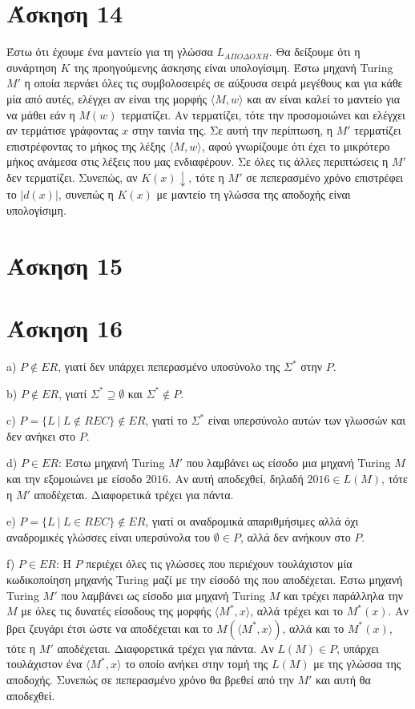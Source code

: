 \documentclass[a4paper, oneside, 11pt]{article}
\theoremstyle{definition}
\begin{document}
\section*{Άσκηση 14}
Έστω ότι έχουμε ένα μαντείο για τη γλώσσα $L_{A\Pi O\Delta OXH}$. Θα δείξουμε ότι η συνάρτηση $K$ της προηγούμενης άσκησης είναι υπολογίσιμη. Έστω μηχανή Turing $M'$ η οποία
περνάει όλες τις συμβολοσειρές σε αύξουσα σειρά μεγέθους και για κάθε μία από αυτές, ελέγχει αν είναι της μορφής $\langle M,w\rangle$ και αν είναι καλεί το μαντείο για να μάθει
εάν η $M(w)$ τερματίζει. Αν τερματίζει, τότε την προσομοιώνει και ελέγχει αν τερμάτισε γράφοντας $x$ στην ταινία της. Σε αυτή την περίπτωση, η $M'$ τερματίζει επιστρέφοντας
το μήκος της λέξης $\langle M, w\rangle$, αφού γνωρίζουμε ότι έχει το μικρότερο μήκος ανάμεσα στις λέξεις που μας ενδιαφέρουν. Σε όλες τις άλλες περιπτώσεις η $M'$ δεν τερματίζει.
Συνεπώς, αν $K(x)\downarrow$, τότε η $M'$ σε πεπερασμένο χρόνο επιστρέφει το $|d(x)|$, συνεπώς η $K(x)$ με μαντείο τη γλώσσα της αποδοχής είναι υπολογίσιμη.

\section*{Άσκηση 15}
\section*{Άσκηση 16}
a) $P\notin ER$, γιατί δεν υπάρχει πεπερασμένο υποσύνολο της $\Sigma^*$ στην $P$.

b) $P\notin ER$, γιατί $\Sigma^*\supseteq \emptyset$ και $\Sigma^*\notin P$.

c) $P=\{L\ |\ L\notin REC\}\notin ER$, γιατί το $\Sigma^*$ είναι υπερσύνολο αυτών των γλωσσών και δεν ανήκει στο $P$.

d) $P\in ER$: Έστω μηχανή Turing $M'$ που λαμβάνει ως είσοδο μια μηχανή Turing $M$ και την εξομοιώνει με είσοδο $2016$. Αν αυτή αποδεχθεί, δηλαδή $2016\in L(M)$, 
τότε η $M'$ αποδέχεται. Διαφορετικά τρέχει για πάντα.

e) $P=\{L\ |\ L\in REC\}\notin ER$, γιατί οι αναδρομικά απαριθμήσιμες αλλά όχι αναδρομικές γλώσσες είναι υπερσύνολα του $\emptyset\in P$, αλλά δεν ανήκουν στο $P$.

f) $P\in ER$: Η $P$ περιέχει όλες τις γλώσσες που περιέχουν τουλάχιστον μία κωδικοποίηση μηχανής Turing μαζί με την είσοδό της που αποδέχεται.
Έστω μηχανή Turing $Μ'$ που λαμβάνει ως είσοδο μια μηχανή Turing $M$ και τρέχει παράλληλα την $M$ με όλες τις δυνατές είσοδους της μορφής $\langle M^*, x\rangle$, αλλά τρέχει
και το $M^*(x)$. Αν βρει ζευγάρι έτσι ώστε να αποδέχεται και το $M(\langle M^*, x\rangle)$, αλλά και το $M^*(x)$, τότε η $M'$ αποδέχεται. Διαφορετικά τρέχει για πάντα.
Αν $L(M)\in P$, υπάρχει τουλάχιστον ένα $\langle M^*, x\rangle$ το οποίο ανήκει στην τομή της $L(M)$ με της γλώσσα της αποδοχής. Συνεπώς σε πεπερασμένο χρόνο θα βρεθεί από την
$M'$ και αυτή θα αποδεχθεί.
\end{document}
